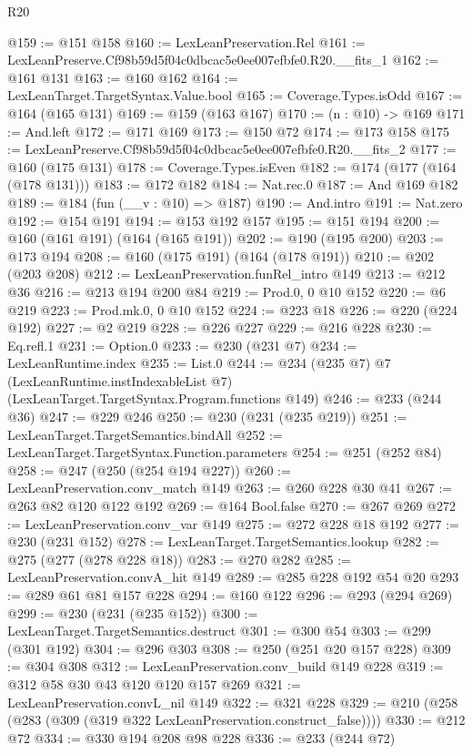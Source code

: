 \begin{lexlean}{R20}
\begin{coremodule}
@159 := @151 @158
@160 := LexLeanPreservation.Rel
@161 := LexLeanPreserve.Cf98b59d5f04c0dbcac5e0ee007efbfe0.R20.__fits_1
@162 := @161 @131
@163 := @160 @162
@164 := LexLeanTarget.TargetSyntax.Value.bool
@165 := Coverage.Types.isOdd
@167 := @164 (@165 @131)
@169 := @159 (@163 @167)
@170 := (n : @10) -> @169
@171 := And.left
@172 := @171 @169
@173 := @150 @72
@174 := @173 @158
@175 := LexLeanPreserve.Cf98b59d5f04c0dbcac5e0ee007efbfe0.R20.__fits_2
@177 := @160 (@175 @131)
@178 := Coverage.Types.isEven
@182 := @174 (@177 (@164 (@178 @131)))
@183 := @172 @182
@184 := Nat.rec.{0}
@187 := And @169 @182
@189 := @184 (fun (__v : @10) => @187)
@190 := And.intro
@191 := Nat.zero
@192 := @154 @191
@194 := @153 @192 @157
@195 := @151 @194
@200 := @160 (@161 @191) (@164 (@165 @191))
@202 := @190 (@195 @200)
@203 := @173 @194
@208 := @160 (@175 @191) (@164 (@178 @191))
@210 := @202 (@203 @208)
@212 := LexLeanPreservation.funRel_intro @149
@213 := @212 @36
@216 := @213 @194 @200 @84
@219 := Prod.{0, 0} @10 @152
@220 := @6 @219
@223 := Prod.mk.{0, 0} @10 @152
@224 := @223 @18
@226 := @220 (@224 @192)
@227 := @2 @219
@228 := @226 @227
@229 := @216 @228
@230 := Eq.refl.{1}
@231 := Option.{0}
@233 := @230 (@231 @7)
@234 := LexLeanRuntime.index
@235 := List.{0}
@244 := @234
    (@235 @7)
    @7
    (LexLeanRuntime.instIndexableList @7)
    (LexLeanTarget.TargetSyntax.Program.functions @149)
@246 := @233 (@244 @36)
@247 := @229 @246
@250 := @230 (@231 (@235 @219))
@251 := LexLeanTarget.TargetSemantics.bindAll
@252 := LexLeanTarget.TargetSyntax.Function.parameters
@254 := @251 (@252 @84)
@258 := @247 (@250 (@254 @194 @227))
@260 := LexLeanPreservation.conv_match @149
@263 := @260 @228 @30 @41
@267 := @263 @82 @120 @122 @192
@269 := @164 Bool.false
@270 := @267 @269
@272 := LexLeanPreservation.conv_var @149
@275 := @272 @228 @18 @192
@277 := @230 (@231 @152)
@278 := LexLeanTarget.TargetSemantics.lookup
@282 := @275 (@277 (@278 @228 @18))
@283 := @270 @282
@285 := LexLeanPreservation.convA_hit @149
@289 := @285 @228 @192 @54 @20
@293 := @289 @61 @81 @157 @228
@294 := @160 @122
@296 := @293 (@294 @269)
@299 := @230 (@231 (@235 @152))
@300 := LexLeanTarget.TargetSemantics.destruct
@301 := @300 @54
@303 := @299 (@301 @192)
@304 := @296 @303
@308 := @250 (@251 @20 @157 @228)
@309 := @304 @308
@312 := LexLeanPreservation.conv_build @149 @228
@319 := @312 @58 @30 @43 @120 @120 @157 @269
@321 := LexLeanPreservation.convL_nil @149
@322 := @321 @228
@329 := @210 (@258 (@283 (@309 (@319 @322 LexLeanPreservation.construct_false))))
@330 := @212 @72
@334 := @330 @194 @208 @98 @228
@336 := @233 (@244 @72)

\end{coremodule}
\end{lexlean}
